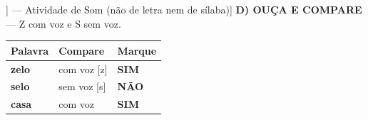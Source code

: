 \begin{exercicio}[Som /z/ [[z]] --- Atividade de Som (não de letra nem de sílaba)]
\textbf{D) OUÇA E COMPARE} --- Z com voz e S sem voz.

\begin{center}
\begin{tabular}{@{}p{4.2cm}p{6.2cm}p{1.6cm}@{}}
\hline
\textbf{Palavra} & \textbf{Compare} & \textbf{Marque} \\
\hline
\textbf{zelo} & com voz [z] & \textbf{SIM} \\
\textbf{selo} & sem voz [s] & \textbf{NÃO} \\
\textbf{casa} & com voz & \textbf{SIM} \\
\hline
\end{tabular}
\end{center}

\end{exercicio}

